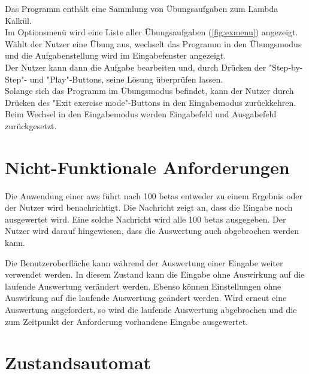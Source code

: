 \documentclass[parskip=full,11pt,twoside]{scrartcl}
\begin{document}
Das Programm enthält eine Sammlung von Übungsaufgaben zum Lambda Kalkül.\\
Im Optionsmenü wird eine Liste aller Übungsaufgaben (\cref{fig:exmenu}) angezeigt.\\
Wählt der Nutzer eine Übung aus, wechselt das Programm in den Übungsmodus und die Aufgabenstellung wird im Eingabefenster angezeigt.\\
Der Nutzer kann dann die Aufgabe bearbeiten und, durch Drücken der "Step-by-Step"- und "Play"-Buttons, seine Lösung überprüfen lassen.\\
Solange sich das Programm im Übungsmodus befindet, kann der Nutzer durch Drücken des "Exit exercise mode"-Buttons in den Eingabemodus zurückkehren.\\
Beim Wechsel in den Eingabemodus werden Eingabefeld und Ausgabefeld zurückgesetzt.


\section{Nicht-Funktionale Anforderungen}


Die Anwendung einer \gls{aws} führt nach 100 \glspl{beta} entweder zu einem Ergebnis oder der Nutzer wird benachrichtigt.
Die Nachricht zeigt an, dass die Eingabe noch ausgewertet wird.
Eine solche Nachricht wird alle 100 \glspl{beta} ausgegeben.
Der Nutzer wird darauf hingewiesen, dass die Auswertung auch abgebrochen werden kann.

Die Benutzeroberfläche kann während der Auswertung einer Eingabe weiter verwendet werden.
In diesem Zustand kann die Eingabe ohne Auswirkung auf die laufende Auswertung verändert werden.
Ebenso können Einstellungen ohne Auswirkung auf die laufende Auswertung geändert werden.
Wird erneut eine Auswertung angefordert, so wird die laufende Auswertung abgebrochen und die zum Zeitpunkt der Anforderung vorhandene Eingabe ausgewertet.

\section{Zustandsautomat}
\end{document}
